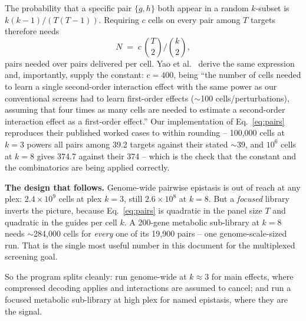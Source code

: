  The probability that a specific pair
$\{g,h\}$ both appear in a random $k$-subset is $k(k-1)/\left(T(T-1)\right)$.
Requiring $c$ cells on every pair among $T$ targets therefore needs
\begin{equation}
  N \;=\; c\,\binom{T}{2}\Big/\binom{k}{2},
  \label{eq:pairs}
\end{equation}
pairs needed over pairs delivered per cell. Yao et al.\ \citep{yaoScalableGeneticScreening2024}
derive the same expression and, importantly, supply the constant: $c=400$, being
``the number of cells needed to learn a single second-order interaction effect with
the same power as our conventional screens had to learn first-order effects
($\sim$100 cells/perturbations), assuming that four times as many cells are needed
to estimate a second-order interaction effect as a first-order effect.'' Our
implementation of Eq.~\ref{eq:pairs} reproduces their published worked cases to
within rounding -- 100{,}000 cells at $k=3$ powers all pairs among 39.2 targets
against their stated $\sim$39, and $10^{6}$ cells at $k=8$ gives 374.7 against
their 374 -- which is the check that the constant and the combinatorics are being
applied correctly.



\begin{keybox}
\textbf{The design that follows.} Genome-wide pairwise epistasis is out of reach at
any plex: $2.4\times10^{9}$ cells at plex $k=3$, still $2.6\times10^{8}$ at
$k=8$. But a \emph{focused} library inverts the picture, because
Eq.~\ref{eq:pairs} is quadratic in the panel size $T$ and quadratic in the
guides per cell $k$. A 200-gene metabolic sub-library at $k=8$ needs
$\sim$284{,}000 cells for \emph{every} one of its 19{,}900 pairs -- one
genome-scale-sized run. That is the single most useful number in this document for
the multiplexed screening goal.
\end{keybox}

So the program splits cleanly: run genome-wide at $k\approx3$ for main effects,
where compressed decoding applies and interactions are assumed to cancel; and run a
focused metabolic sub-library at high plex for named epistasis, where they are the
signal.

